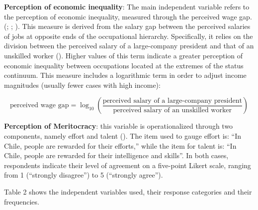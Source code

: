 \documentclass[
  12pt,
]{article}
\begin{document}
\textbf{Perception of economic inequality}: The main independent
variable refers to the perception of economic inequality, measured
through the perceived wage gap.
(;
;
). This measure is derived
from the salary gap between the perceived salaries of jobs at opposite
ends of the occupational hierarchy. Specifically, it relies on the
division between the perceived salary of a large-company president and
that of an unskilled worker (). Higher values of this term indicate a greater perception of
economic inequality between occupations located at the extremes of the
status continuum. This measure includes a logarithmic term in order to
adjust income magnitudes (usually fewer cases with high income):

\[
\text{perceived wage gap} = \log_{10}\left(\frac{\text{perceived salary of a large-company president}}{\text{perceived salary of an unskilled worker}}\right)
\]

\textbf{Perception of Meritocracy}: this variable is operationalized
through two components, namely effort and talent
(). The item used to gauge
effort is: ``In Chile, people are rewarded for their efforts,'' while
the item for talent is: ``In Chile, people are rewarded for their
intelligence and skills''. In both cases, respondents indicate their
level of agreement on a five-point Likert scale, ranging from 1
(``strongly disagree'') to 5 (``strongly agree'').

Table 2 shows the independent variables used, their response categories
and their frequencies.
\end{document}
